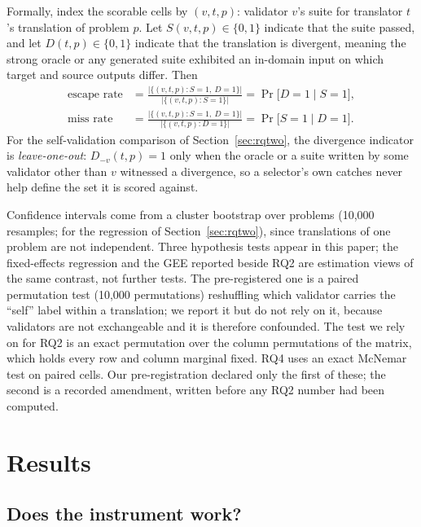 \documentclass[sigconf]{acmart}
\begin{document}
Formally, index the scorable cells by $(v,t,p)$: validator $v$'s suite for translator $t$'s
translation of problem $p$. Let $S(v,t,p)\in\{0,1\}$ indicate that the suite passed, and let
$D(t,p)\in\{0,1\}$ indicate that the translation is divergent, meaning the strong oracle or any
generated suite exhibited an in-domain input on which target and source outputs differ. Then
\begin{align*}
\text{escape rate} &= \frac{\bigl|\{(v,t,p): S{=}1,\ D{=}1\}\bigr|}
                          {\bigl|\{(v,t,p): S{=}1\}\bigr|}
  = \Pr\bigl[D{=}1 \mid S{=}1\bigr],\\[2pt]
\text{miss rate} &= \frac{\bigl|\{(v,t,p): S{=}1,\ D{=}1\}\bigr|}
                        {\bigl|\{(v,t,p): D{=}1\}\bigr|}
  = \Pr\bigl[S{=}1 \mid D{=}1\bigr].
\end{align*}
For the self-validation comparison of Section~\ref{sec:rqtwo}, the divergence indicator is
\emph{leave-one-out}: $D_{-v}(t,p)=1$ only when the oracle or a suite written by some validator
other than $v$ witnessed a divergence, so a selector's own catches never help define the set it
is scored against.

Confidence intervals come from a cluster bootstrap over problems (10,000 resamples;
\NBootRegression{} for the regression of Section~\ref{sec:rqtwo}), since
translations of one problem are not independent. Three hypothesis tests appear in this paper; the fixed-effects regression and the GEE
reported beside RQ2 are estimation views of the same contrast, not further tests. The pre-registered one is a paired permutation test (10,000 permutations)
reshuffling which validator carries the ``self'' label within a translation; we report it but do
not rely on it, because validators are not exchangeable and it is therefore confounded. The test
we rely on for RQ2 is an exact permutation over the \DiagPerms{} column permutations of the
matrix, which holds every row and column marginal fixed. RQ4 uses an exact McNemar test on paired
cells. Our pre-registration declared only the first of these; the second is a recorded
amendment, written before any RQ2 number had been computed.

\section{Results}

\subsection{Does the instrument work?}
\label{sec:instrument}
\end{document}
